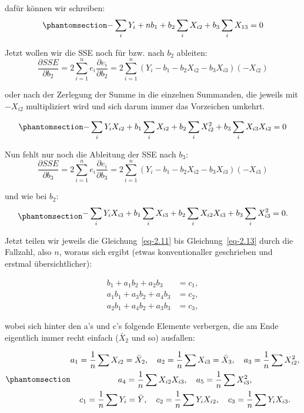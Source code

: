 \documentclass[
  10pt,
  letterpaper,
  a4paper, twoside]{scrreprt}
\begin{document}
\begin{tcolorbox}
dafür können wir schreiben:
\begin{equation}\phantomsection\label{eq-2.11}{
-\sum_i Y_i+n b_1+b_2 \sum_i X_{i 2}+b_3 \sum_i X_{13}=0
}\end{equation}

Jetzt wollen wir die SSE noch für bzw. nach \(b_2\) ableiten: \[
\frac{\partial S S E}{\partial b_2}=2 \sum_{i=1}^n e_i \frac{\partial e_i}{\partial b_2}=2 \sum_{i=1}^n\left(Y_i-b_1-b_2 X_{i 2}-b_3 X_{i 3}\right)\left(-X_{i 2}\right) 
\]

oder nach der Zerlegung der Summe in die einzelnen Summanden, die
jeweils mit \(-X_{i 2}\) multipliziert wird und sich darum immer das
Vorzeichen umkehrt.

\begin{equation}\phantomsection\label{eq-2.12}{
-\sum_i Y_i X_{i 2}+b_1 \sum_i X_{i 2}+b_2 \sum_i X_{i 2}^2+b_3 \sum_i X_{i 3} X_{i 2}=0 
}\end{equation}

Nun fehlt nur noch die Ableitung der SSE nach \(b_3\): \[
\frac{\partial S S E}{\partial b_3}=2 \sum_{i=1}^n e_i \frac{\partial e_i}{\partial b_3}=2 \sum_{i=1}^n\left(Y_i-b_1-b_2 X_{i 2}-b_3 X_{i 3}\right)\left(-X_{i 3}\right) 
\]

und wie bei \(b_2\): \begin{equation}\phantomsection\label{eq-2.13}{
\begin{gathered}
-\sum_i Y_i X_{i 3}+b_1 \sum_i X_{i 3}+b_2 \sum_i X_{i 2} X_{i 3}+b_3 \sum_i X_{i 3}^2=0 .
\end{gathered}
}\end{equation}

Jetzt teilen wir jeweils die Gleichung~\ref{eq-2.11} bis
Gleichung~\ref{eq-2.13} durch die Fallzahl, also \(n\), woraus sich
ergibt (etwas konventionaller geschrieben und erstmal übersichtlicher):

\begin{align}
b_1+a_1 b_2+a_2 b_3 & =c_1, \\
a_1 b_1+a_3 b_2+a_4 b_3 & =c_2, \\
a_2 b_1+a_4 b_2+a_3 b_3 & =c_3,
\end{align}

wobei sich hinter den a's und c's folgende Elemente verbergen, die am
Ende eigentlich immer recht einfach (\(\bar{X}_2\) und so) ausfallen:

\begin{equation}\phantomsection\label{eq-2.13b}{
\begin{gathered}
a_1=\frac{1}{n} \sum X_{i 2}=\bar{X}_2, \quad a_2=\frac{1}{n} \sum X_{i 3}=\bar{X}_3, \quad a_3=\frac{1}{n} \sum X_{i 2}^2, \\
a_4=\frac{1}{n} \sum X_{i 2} X_{i 3}, \quad a_5=\frac{1}{n} \sum X_{i 3}^2, \\
c_1=\frac{1}{n} \sum Y_i=\bar{Y}, \quad c_2=\frac{1}{n} \sum Y_i X_{i 2}, \quad c_3=\frac{1}{n} \sum Y_i X_{i 3} .
\end{gathered}
}\end{equation}


\end{tcolorbox}
\end{document}
